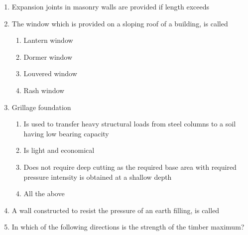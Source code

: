 \documentclass[11pt,a4paper]{article}
\begin{document}
\begin{enumerate}
\\\begin{enumerate*}[itemjoin=\qquad, label=\Alph*.]
\item{55 cm}
\item{70 cm}
\item{85 cm}
\item{100 cm}
\end{enumerate*}
\item{Expansion joints in masonry walls are provided if length exceeds}
\\
\item{The window which is provided on a sloping roof of a building, is called}
\begin{enumerate}[label=\Alph*.]
\item{Lantern window}
\item{Dormer window}
\item{Louvered window}
\item{Rash window}
\end{enumerate}
\item{Grillage foundation}
\begin{enumerate}[label=\Alph*.]
\item{Is used to transfer heavy structural loads from steel columns to a soil having low bearing capacity}
\item{Is light and economical}
\item{Does not require deep cutting as the required base area with required pressure intensity is obtained at a shallow depth}
\item{All the above}
\end{enumerate}
\item{A wall constructed to resist the pressure of an earth filling, is called}
\\
\item{In which of the following directions is the strength of the timber maximum?}

\end{enumerate}
\end{document}
